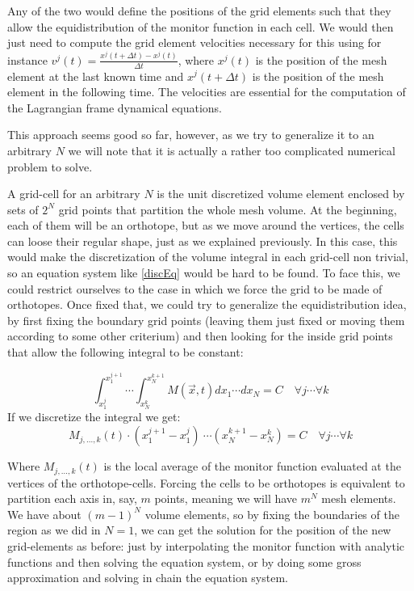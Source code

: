 \documentclass[11pt, a4paper]{article} %
\begin{document}
Any of the two would define the positions of the grid elements such that they allow the equidistribution of the monitor function in each cell. We would then just need to compute the grid element velocities necessary for this using for instance $v^j(t)=\frac{x^j(t+\Delta t)-x^j(t)}{\Delta t}$, where $x^j(t)$ is the position of the mesh element at the last known time and $x^j(t+\Delta t)$ is the position of the mesh element in the following time. The velocities are essential for the computation of the Lagrangian frame dynamical equations.

This approach seems good so far, however, as we try to generalize it to an arbitrary $N$ we will note that it is actually a rather too complicated numerical problem to solve.

A grid-cell for an arbitrary $N$ is the unit discretized volume element enclosed by sets of $2^N$ grid points that partition the whole mesh volume. At the beginning, each of them will be an orthotope, but as we move around the vertices, the cells can loose their regular shape, just as we explained previously. In this case, this would make the discretization of the volume integral in each grid-cell non trivial, so an equation system like \eqref{discEq} would be hard to be found. To face this, we could restrict ourselves to the case in which we force the grid to be made of orthotopes. Once fixed that, we could try to generalize the equidistribution idea, by first fixing the boundary grid points (leaving them just fixed or moving them according to some other criterium) and then looking for the inside grid points that allow the following integral to be constant:

\begin{equation}
\int_{x_1^j}^{x_1^{j+1}}\cdots \int_{x_N^k}^{x_N^{k+1}} M(\vec{x},t) dx_1 \cdots dx_N=C \quad \forall j\cdots \forall k
\end{equation}
If we discretize the integral we get:
\begin{equation}\label{monitor}
 M_{j,...,k}(t)\cdot (x_1^{j+1}-x_1^j)\ \cdots (x_N^{k+1}-x_N^k) =C \quad \forall j\cdots \forall k
\end{equation}

Where $M_{j,...,k}(t)$ is the local average of the monitor function evaluated at the vertices of the orthotope-cells. Forcing the cells to be orthotopes is equivalent to partition each axis in, say, $m$ points, meaning we will have $m^N$ mesh elements. We have about $(m-1)^N$ volume elements, so by fixing the boundaries of the region as we did in $N=1$, we can get the solution for the position of the new grid-elements as before: just by interpolating the monitor function with analytic functions and then solving the equation system, or by doing some gross approximation and solving in chain the equation system.
\end{document}
